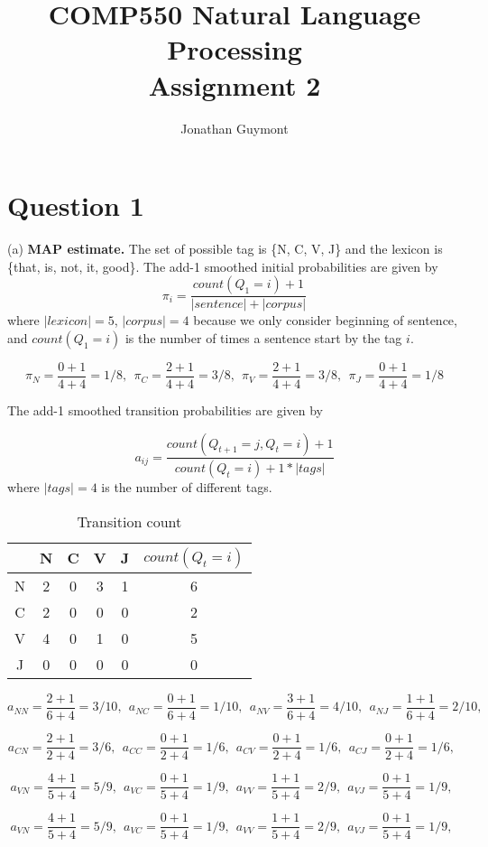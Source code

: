 \documentclass[10pt]{article}
\title{COMP550 Natural Language Processing\\Assignment 2}
\author{Jonathan Guymont}
\begin{document}
\maketitle

\section*{Question 1}

(a) \textbf{MAP estimate.} The set of possible tag is \{N, C, V, J\} and the lexicon is \{that, is, not, it, good\}. The add-1 smoothed initial probabilities are given by
\[
	\pi_i = \frac{count(Q_1=i) + 1}{|sentence| + |corpus|}
\]
where $|lexicon|=5$, $|corpus|=4$ because we only consider beginning of sentence, and $count(Q_1=i)$ is the number of times a sentence start by the tag $i$.

\[
	\pi_N = \frac{0 + 1}{4 + 4} = 1/8,~~
	\pi_C = \frac{2 + 1}{4 + 4} = 3/8,~~ 
	\pi_V = \frac{2 + 1}{4 + 4} = 3/8,~~ 
	\pi_J = \frac{0 + 1}{4 + 4} = 1/8 
\]

The add-1 smoothed transition probabilities are given by

\[
	a_{ij} = \frac{count(Q_{t+1}=j, Q_t=i)+1}{count(Q_t=i)+1*|tags|}
\]
where $|tags|=4$ is the number of different tags.
\begin{table}[h!]
	\centering
	\begin{tabular}{ c|c|c|c|c|c }
		  & N & C & V &	J & $count(Q_t=i)$ \\
		\hline
		N & 2 & 0 & 3 & 1 & 6 \\
		\hline
		C & 2 & 0 & 0 & 0 & 2 \\
		\hline
		V & 4 & 0 & 1 & 0 & 5 \\
		\hline
		J & 0 & 0 & 0 & 0 & 0 \\
		\hline
	\end{tabular}
	\caption{Transition count}
	\label{table:result}
\end{table}

\[
	a_{NN} = \frac{2+1}{6+4}=3/10,~~
	a_{NC} = \frac{0+1}{6+4}=1/10,~~
	a_{NV} = \frac{3+1}{6+4}=4/10,~~
	a_{NJ} = \frac{1+1}{6+4}=2/10,~~
\]

\[
	a_{CN} = \frac{2+1}{2+4}=3/6,~~
	a_{CC} = \frac{0+1}{2+4}=1/6,~~
	a_{CV} = \frac{0+1}{2+4}=1/6,~~
	a_{CJ} = \frac{0+1}{2+4}=1/6,~~
\]

\[
	a_{VN} = \frac{4+1}{5+4}=5/9,~~
	a_{VC} = \frac{0+1}{5+4}=1/9,~~
	a_{VV} = \frac{1+1}{5+4}=2/9,~~
	a_{VJ} = \frac{0+1}{5+4}=1/9,~~
\]

\[
	a_{VN} = \frac{4+1}{5+4}=5/9,~~
	a_{VC} = \frac{0+1}{5+4}=1/9,~~
	a_{VV} = \frac{1+1}{5+4}=2/9,~~
	a_{VJ} = \frac{0+1}{5+4}=1/9,~~
\]
\end{document}
